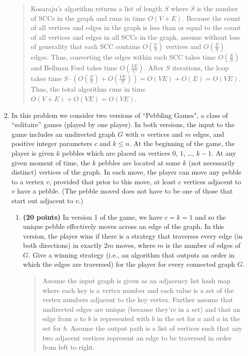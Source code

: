 \documentclass[11pt]{article}
\begin{document}
\begin{enumerate}
\begin{quote}
\medskip
Kosaraju's algorithm returns a list of length $S$ where $S$ is the number of SCCs in the graph and runs in time $O(V + E)$. Because the count of all vertices and edges in the graph is less than or equal to the count of all vertices and edges in all SCCs in the graph, assume without loss of generality that each SCC contains $O(\frac{V}{S})$ vertices and $O(\frac{E}{S})$ edges. Thus, converting the edges within each SCC takes time $O(\frac{E}{S})$ and Bellman Ford takes time $O(\frac{VE}{C})$. After $S$ iterations, the loop takes time $S \cdot (O(\frac{E}{S}) + O(\frac{VE}{S})) = O(VE) + O(E) = O(VE)$. Thus, the total algorithm runs in time $O(V + E) + O(VE) = O(VE)$. 
\end{quote}

\item %
In this problem we consider two versions of ``Pebbling Games", a class of ``solitaire'' games (played by one player). In both versions, the input to the game  includes an undirected graph $G$ with $n$ vertices and $m$ edges, and positive integer parameters $c$ and $k\le n$. At the beginning of the game, the player is given $k$ pebbles which are placed on vertices $0$, $1$, \ldots, $k-1$. At any given moment of time, the $k$ pebbles are located at some $k$ (not necessarily distinct) vertices of the graph. In each move, the player can move any pebble to a vertex $v$, provided that prior to this move, at least $c$ vertices adjacent to $v$ have a pebble. (The pebble moved does not have to be one of those that start out adjacent to $v$.)
\begin{enumerate}
    \item 
    {\bf (20 points)}
    In version 1 of the game, we have $c=k=1$ and so the unique pebble effectively moves across an edge of the graph. In this version, the player wins if there is a strategy that traverses every edge (in both directions) in exactly $2m$ moves, where $m$ is the number of edges of $G$. Give a winning strategy (i.e., an algorithm that outputs an order in which the edges are traversed) for the player for every connected graph $G$. 
    \begin{quote}
      \color{purple}
      Assume the input graph is given as an adjacency list hash map where each key is a vertex number and each value is a set of the vertex numbers adjacent to the key vertex. Further assume that undirected edges are unique (because they're in a set) and that an edge from $a$ to $b$ is represented with $b$ in the set for $a$ and $a$ in the set for $b$. Assume the output path is a list of vertices such that any two adjacent vertices represent an edge to be traversed in order from left to right.  


\end{quote}
\end{enumerate}
\end{enumerate}
\end{document}
